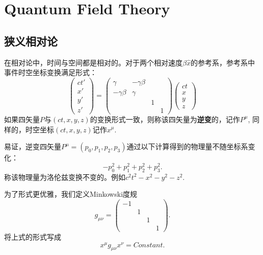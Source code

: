 \chapter{Quantum Field Theory}

\section{狭义相对论}
在相对论中，时间与空间都是相对的。对于两个相对速度$\beta\hat{x}$的参考系，参考系中事件时空坐标变换满足形式：
\begin{equation}
    \begin{pmatrix}
        ct' \\ x' \\ y' \\ z' 
    \end{pmatrix}=
    \begin{pmatrix}
        \gamma & -\gamma\beta &&\\
        -\gamma\beta & \gamma &&\\
        &&1&\\
        &&&1
    \end{pmatrix}
    \begin{pmatrix}
        ct \\ x \\ y \\ z
    \end{pmatrix}
\end{equation}
如果四矢量$P$与$(ct,x,y,z)$的变换形式一致，则称该四矢量为\textbf{逆变}的，记作$P^\mu$, 同样的，时空坐标$(ct,x,y,z)$记作$x^\mu$.

易证，逆变四矢量$P^\mu=(p_0,p_1,p_2,p_3)$通过以下计算得到的物理量不随坐标系变化：
\begin{equation}
    -p_0^2+p_1^2+p_2^2+p_3^2.
\end{equation}
称该物理量为洛伦兹变换不变的。例如$c^2t^2-x^2-y^2-z^2$.

为了形式更优雅，我们定义Minkowski度规
\begin{equation}
    g_{\mu\nu}=\begin{pmatrix}
        -1 &&&\\
        &1 &&\\
        &&1&\\
        &&&1
    \end{pmatrix}.
\end{equation}
将上式的形式写成
\begin{equation}
    x^\mu g_{\mu\nu} x^\nu = Constant.
\end{equation}

